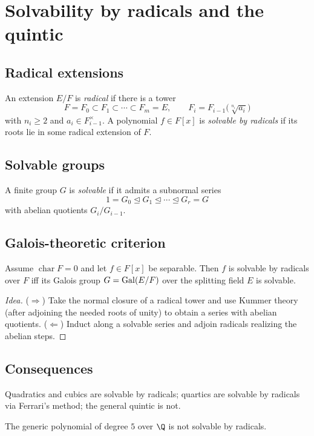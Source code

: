 \section{Solvability by radicals and the quintic}\label{sec:radicals-quintic}

\subsection{Radical extensions}
\begin{definition}
An extension $E/F$ is \emph{radical} if there is a tower
\[
F=F_0\subset F_1\subset\cdots\subset F_m=E,\qquad
F_{i}=F_{i-1}\bigl(\sqrt[n_i]{a_i}\bigr)
\]
with $n_i\ge2$ and $a_i\in F_{i-1}^\times$. A polynomial $f\in F[x]$ is \emph{solvable by radicals} if its roots lie in some radical extension of $F$.
\end{definition}

\subsection{Solvable groups}
\begin{definition}
A finite group $G$ is \emph{solvable} if it admits a subnormal series
\[
1=G_0\trianglelefteq G_1\trianglelefteq\cdots\trianglelefteq G_r=G
\]
with abelian quotients $G_{i}/G_{i-1}$.
\end{definition}

\subsection{Galois-theoretic criterion}
\begin{theorem}
Assume $\operatorname{char}F=0$ and let $f\in F[x]$ be separable. Then $f$ is solvable by radicals over $F$ iff its Galois group
$G=\operatorname{Gal}(E/F)$ over the splitting field $E$ is solvable.
\end{theorem}
\begin{proof}[Idea]
($\Rightarrow$) Take the normal closure of a radical tower and use Kummer theory (after adjoining the needed roots of unity) to obtain a series with abelian quotients. ($\Leftarrow$) Induct along a solvable series and adjoin radicals realizing the abelian steps.
\end{proof}

\subsection{Consequences}
\begin{corollary}
Quadratics and cubics are solvable by radicals; quartics are solvable by radicals via Ferrari's method; the general quintic is not.
\end{corollary}
\begin{theorem}
The generic polynomial of degree $5$ over $\Q$ is not solvable by radicals.
\end{theorem}

